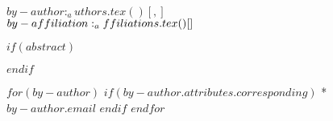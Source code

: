 \begin{flushleft}
{\Large
\textbf{}
}
\newline
\\
$by-author:_authors.tex()[, ]$
\\
\bigskip
$by-affiliation:_affiliations.tex()[\\ ]$
\bigskip


\end{flushleft}

\linenumbers

$if(abstract)$
\begin{abstract}
$abstract$
\end{abstract}
$endif$

$for(by-author)$
$if(by-author.attributes.corresponding)$
* $by-author.email$
$endif$
$endfor$
